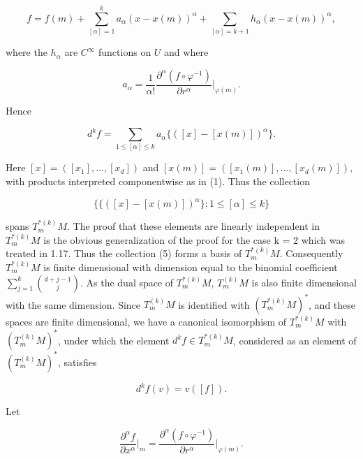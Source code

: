 \begin{equation}
	\tag{2}\label{eq:1.26:2}
	f=f(m)+\sum_{[\alpha]=1}^{k}a_{\alpha}(x-x(m))^{\alpha}+\sum_{[\alpha]=k+1}h_{\alpha}(x-x(m))^{\alpha},
\end{equation}


where the $h_{\alpha}$ are $C^{\infty}$ functions on $U$ and where

\begin{equation}
	\tag{3}\label{eq:1.26:3}
	a_{\alpha}=\frac{1}{\alpha!}\frac{\partial^{\alpha}(f\circ\varphi^{-1})}{\partial r^{\alpha}}\bigg|_{\varphi(m)}.
\end{equation}

Hence

\begin{equation}
	\tag{4}\label{eq:1.26:4}
	d^{k}f=\sum_{1\leq[\alpha]\leq k}a_{\alpha}\{\left([x]-[x(m)]\right)^{\alpha}\}.
\end{equation}

Here $[x]=([x_1],\ldots,[x_d])$ and $[x(m)]=([x_1(m)],\ldots,[x_d(m)])$, with products interpreted componentwise as in (1).
Thus the collection

\begin{equation}
	\tag{5}\label{eq:1.26:5}
	\big\{\{([x]-[x(m)])^{\alpha}\}\colon1\leq[\alpha]\leq k\big\}
\end{equation}

spans  $ T_{m}^{*(k)} M $. The proof that these elements are linearly independent in  $ T_{m}^{*(k)} M $ is the obvious generalization of the proof for the case k = 2 which was treated in 1.17. Thus the collection (5) forms a basis of  $ T_{m}^{*(k)} M $. Consequently  $ T_{m}^{*(k)} M $ is finite dimensional with dimension equal to the binomial coefficient  $ \sum_{j=1}^{k}\binom{d+j-1}{j} $. As the dual space of  $ T_{m}^{*(k)} M $,  $ T_{m}^{(k)} M $ is also finite dimensional with the same dimension. Since  $ T_{m}^{(k)} M $ is identified with  $ (T_{m}^{*(k)} M)^{*} $, and these spaces are finite dimensional, we have a canonical isomorphism of  $ T_{m}^{*(k)} M $ with  $ (T_{m}^{(k)} M)^{*} $, under which the element $d^{k}f \in T_{m}^{*(k)} M$, considered as an element of  $ (T_{m}^{(k)} M)^{*} $, satisfies

\begin{equation}
	\tag{6}\label{eq:1.26:6}
	d^{k}f(v)=v([f]).
\end{equation}

Let

\begin{equation}
	\tag{7}\label{eq:1.26:7}
	\frac{\partial^{\alpha}f}{\partial x^{\alpha}}\bigg|_{m}=\frac{\partial^{\alpha}(f\circ\varphi^{-1})}{\partial r^{\alpha}}\bigg|_{\varphi(m)}.
\end{equation}

